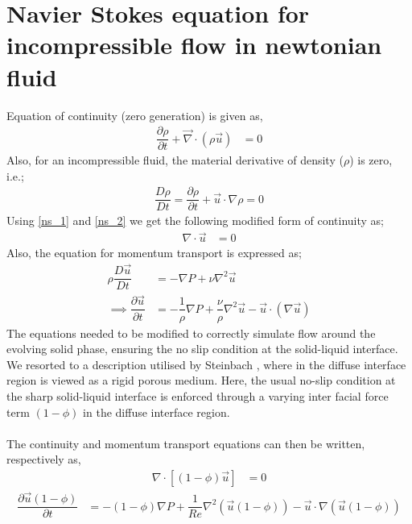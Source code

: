 \documentclass[12pt,a4paper]{report}
\begin{document}
\section{Navier Stokes equation for incompressible flow in newtonian fluid}
Equation of continuity (zero generation) is given as,
		\begin{align}
			\dfrac{\partial\rho}{\partial t} + \vec{\nabla}\cdot(\rho\vec{u}) &= 0
			\label{ns_1}
		\end{align}
Also, for an incompressible fluid, the material derivative of density ($\rho$)
	is zero, i.e.;
		\begin{align}
			\dfrac{D\rho}{Dt} = \dfrac{\partial \rho}{\partial t} + \vec{u}\cdot\nabla\rho = 0
			\label{ns_2}
		\end{align}
	Using \ref{ns_1} and \ref{ns_2} we get the following modified form of continuity as;
	\begin{align}
		\nabla\cdot\vec{u} &= 0
		\label{ns_3}
	\end{align}
Also, the equation for momentum transport is expressed as;
	\begin{align}
		\rho\dfrac{D\vec{u}}{D t} &= - \nabla P + \nu\nabla^2\vec{u}\\		
		\implies \dfrac{\partial \vec{u}}{\partial t} &= - \dfrac{1}{\rho}\nabla P + \dfrac{\nu}{\rho}\nabla^2\vec{u} - \vec{u}\cdot\left(\nabla\vec{u}\right)
	\end{align}
The equations needed to be modified to correctly simulate flow around the evolving solid phase, ensuring the no slip condition
at the solid-liquid interface. We resorted to a description utilised by Steinbach \cite{Stein}, where in the diffuse interface region is viewed as a rigid porous medium. Here, the usual no-slip condition at the sharp solid-liquid interface is enforced through a varying inter facial force term $(1-\phi)$ in the diffuse interface region.\\
\\
The continuity and momentum transport equations can then be written, respectively as,
\begin{align}
		\nabla\cdot[(1-\phi)\vec{u}] &= 0
\end{align}
\begin{align}
	\dfrac{\partial \vec{u}(1-\phi)}{\partial t} &= -(1-\phi)\nabla P + \dfrac{1}{Re}\nabla^2\left(\vec{u}(1-\phi)\right) - \vec{u}\cdot\nabla\left(\vec{u}(1-\phi)\right)
\end{align}
\end{document}
